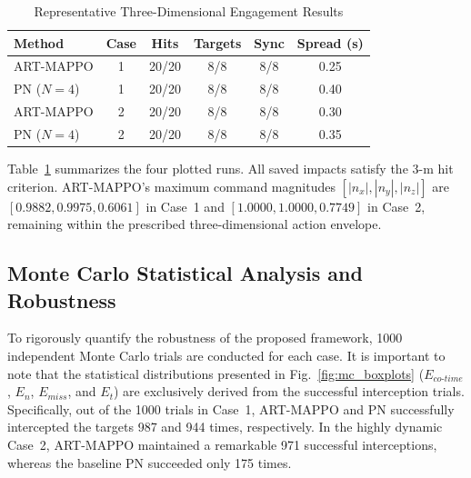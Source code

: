 \documentclass[lettersize,journal]{IEEEtran}
\providecommand{\DIFadd}[1]{{\protect\color{blue} #1}} %
\providecommand{\DIFaddbegin}{} %
\providecommand{\DIFaddend}{} %
\providecommand{\DIFaddFL}[1]{\DIFadd{#1}} %
\begin{document}
\DIFaddbegin \begin{table}[H]
\centering
\caption{\DIFaddFL{Representative Three-Dimensional Engagement Results}}
\label{tab:representative_cases}
\scriptsize
\setlength{\tabcolsep}{2.5pt}
\begin{tabular}{lccccc}
\toprule
\DIFaddFL{Method }& \DIFaddFL{Case }& \DIFaddFL{Hits }& \DIFaddFL{Targets }& \DIFaddFL{Sync }& \DIFaddFL{Spread (s) }\\
\midrule
\DIFaddFL{ART-MAPPO }& \DIFaddFL{1 }& \DIFaddFL{20/20 }& \DIFaddFL{8/8 }& \DIFaddFL{8/8 }& \DIFaddFL{0.25 }\\
\DIFaddFL{PN (\(N=4\)) }& \DIFaddFL{1 }& \DIFaddFL{20/20 }& \DIFaddFL{8/8 }& \DIFaddFL{8/8 }& \DIFaddFL{0.40 }\\
\DIFaddFL{ART-MAPPO }& \DIFaddFL{2 }& \DIFaddFL{20/20 }& \DIFaddFL{8/8 }& \DIFaddFL{8/8 }& \DIFaddFL{0.30 }\\
\DIFaddFL{PN (\(N=4\)) }& \DIFaddFL{2 }& \DIFaddFL{20/20 }& \DIFaddFL{8/8 }& \DIFaddFL{8/8 }& \DIFaddFL{0.35 }\\
\bottomrule
\end{tabular}
\end{table}

\DIFadd{Table~\ref{tab:representative_cases} summarizes the four plotted runs. All
saved impacts satisfy the 3-m hit criterion. ART-MAPPO's maximum command
magnitudes \([|n_x|,|n_y|,|n_z|]\) are
\([0.9882,0.9975,0.6061]\) in Case~1 and
\([1.0000,1.0000,0.7749]\) in Case~2, remaining within the prescribed
three-dimensional action envelope.
}

\DIFaddend \subsection{Monte Carlo Statistical Analysis and Robustness}
\label{subsec:montecarlo}

To rigorously quantify the robustness of the proposed framework, 1000 independent Monte Carlo trials are conducted for each case. It is important to note that the statistical distributions presented in Fig.~\ref{fig:mc_boxplots} ($E_{co\text{-}time}$, $E_n$, $E_{miss}$, and $E_t$) are exclusively derived from the successful interception trials. Specifically, out of the 1000 trials in Case~1, ART-MAPPO and PN successfully intercepted the targets 987 and 944 times, respectively. In the highly dynamic Case~2, ART-MAPPO maintained a remarkable 971 successful interceptions, whereas the baseline PN succeeded only 175 times. 
\end{document}
